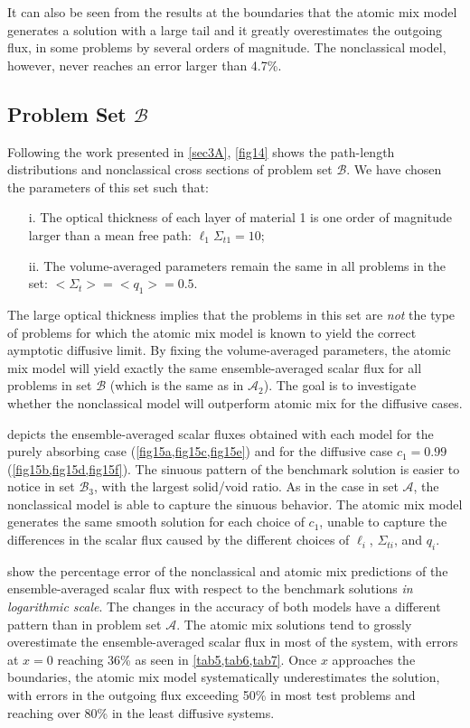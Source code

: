 \documentclass[12pt]{article}
\newcommand{\bl}{\big<}
\newcommand{\bg}{\big>}
\newcommand{\seta}{\mathcal{A}}
\newcommand{\setb}{\mathcal{B}}
\begin{document}
{It can also be seen from the results at the boundaries that the atomic mix model generates a solution with a large tail and it greatly overestimates the outgoing flux, in some problems by several orders of magnitude. The nonclassical model, however, never reaches an error larger than 4.7\%.

\subsection{Problem Set $\setb$}

Following the work presented in \cref{sec3A}, \cref{fig14} shows the path-length distributions and nonclassical cross sections of problem set $\setb$. We have chosen the parameters of this set such that:
\begin{itemize}
\item[i.] The optical thickness of each layer of material 1 is one order of magnitude larger than a mean free path: $\ell_1\Sigma_{t1} = 10$;
\vspace{-4pt}
\item[ii.] The volume-averaged parameters remain the same in all problems in the set: $\bl \Sigma_t \bg = \bl q_1 \bg = 0.5$.
\end{itemize}
The large optical thickness implies that the problems in this set are {\em not} the type of problems for which the atomic mix model is known to yield the correct aymptotic diffusive limit. By fixing the volume-averaged parameters, the atomic mix model will yield exactly the same ensemble-averaged scalar flux for all problems in set $\setb$ (which is the same as in $\seta_2$). The goal is to investigate whether the nonclassical model will outperform atomic mix for the diffusive cases.

 depicts the ensemble-averaged scalar fluxes obtained with each model for the purely absorbing case (\cref{fig15a,fig15c,fig15e}) and for the diffusive case $c_1=0.99$ (\cref{fig15b,fig15d,fig15f}). The sinuous pattern of the benchmark solution is easier to notice in set $\setb_3$, with the largest solid/void ratio. As in the case in set $\seta$, the
nonclassical model is able to capture the sinuous behavior. The atomic mix model generates the same smooth solution for each choice of $c_1$, unable to capture the differences in the scalar flux caused by the different choices of $\ell_i$, $\Sigma_{ti}$, and $q_i$.

 show the percentage error of the nonclassical and atomic mix predictions of the ensemble-averaged scalar flux with respect to the benchmark solutions {\em in logarithmic scale}. The changes in the accuracy of both models have a different pattern than in problem set $\seta$. The atomic mix solutions tend to grossly overestimate the ensemble-averaged scalar flux in most of the system, with errors at $x=0$ reaching 36\% as seen in \cref{tab5,tab6,tab7}. Once $x$ approaches the boundaries, the atomic mix model systematically underestimates the solution, with errors in the outgoing flux exceeding 50\% in most test problems and reaching over 80\% in the least diffusive systems.

}
\end{document}
